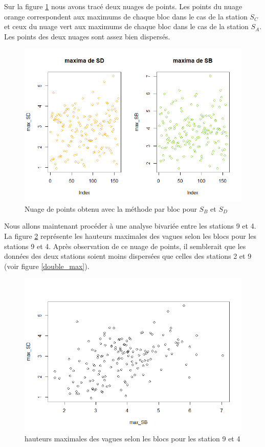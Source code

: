 \documentclass[a4paper,french,10pt]{article}
\begin{document}
Sur la figure \ref{max_SB_SD} nous avons tracé deux nuages de points. Les points du nuage orange correspondent aux maximums de chaque bloc dans le cas de la station $S_C$ et ceux du nuage vert aux maximums de chaque bloc dans le cas de la station $S_A$. Les points des deux nuages sont assez bien dispersés.
\begin{figure}[htp] 
	\centering
	\includegraphics[scale=0.45]{images/max_SB_SD.png}
	\caption{Nuage de points obtenu avec la méthode par bloc pour $S_B$ et $S_D$}
	\label{max_SB_SD}
\end{figure}

Nous allons maintenant procéder à une analyse bivariée entre les stations 9 et 4. La figure \ref{double_max3} représente les hauteurs maximales des vagues selon les blocs pour les stations 9 et 4. Après observation de ce nuage de points, il semblerait que les données des deux stations soient moins dispersées que celles des stations 2 et 9 (voir figure \ref{double_max}).

\begin{figure}[htp] 
	\centering
	\includegraphics[scale=0.45]{images/double_max3.png}
	\caption{hauteurs maximales des vagues selon les blocs pour les station 9 et 4}
	\label{double_max3}
\end{figure}
\end{document}
